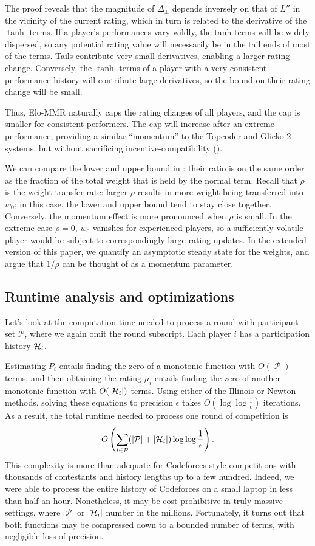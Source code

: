 The proof reveals that the magnitude of $\Delta_{\pm}$ depends inversely on that of $L''$ in the vicinity of the current rating, which in turn is related to the derivative of the $\tanh$ terms. If a player's performances vary wildly, the tanh terms will be widely dispersed, so any potential rating value will necessarily be in the tail ends of most of the terms. Tails contribute very small derivatives, enabling a larger rating change. Conversely, the $\tanh$ terms of a player with a very consistent performance history will contribute large derivatives, so the bound on their rating change will be small.

Thus, Elo-MMR naturally caps the rating changes of all players, and the cap is smaller for consistent performers. The cap will increase after an extreme performance, providing a similar ``momentum'' to the Topcoder and Glicko-2 systems, but without sacrificing incentive-compatibility ().

We can compare the lower and upper bound in : their ratio is on the same order as the fraction of the total weight that is held by the normal term. Recall that $\rho$ is the weight transfer rate: larger $\rho$ results in more weight being transferred into $w_0$; in this case, the lower and upper bound tend to stay close together. Conversely, the momentum effect is more pronounced when $\rho$ is small. In the extreme case $\rho=0$, $w_0$ vanishes for experienced players, so a sufficiently volatile player would be subject to correspondingly large rating updates. In the extended version of this paper, we quantify an asymptotic steady state for the weights, and argue that $1/\rho$ can be thought of as a momentum parameter.

\subsection{Runtime analysis and optimizations}
\label{sec:runtime}
Let's look at the computation time needed to process a round with participant set $\mathcal P$, where we again omit the round subscript. Each player $i$ has a participation history ${\mathcal{H}}_i$.

Estimating $P_i$ entails finding the zero of a monotonic function with $O(|\mathcal P|)$ terms, and then obtaining the rating $\mu_i$ entails finding the zero of another monotonic function with $O(|{\mathcal{H}}_i|)$ terms. Using either of the Illinois or Newton methods, solving these equations to precision $\epsilon$ takes $O(\log\log\frac 1\epsilon)$ iterations. As a result, the total runtime needed to process one round of competition is
\[O\left(\sum_{i\in\mathcal P}(|\mathcal P| + |{\mathcal{H}}_i|) \log\log\frac 1\epsilon\right).\]
This complexity is more than adequate for Codeforces-style competitions with thousands of contestants and history lengths up to a few hundred. Indeed, we were able to process the entire history of Codeforces on a small laptop in less than half an hour. Nonetheless, it may be cost-prohibitive in truly massive settings, where $|\mathcal P|$ or $|{\mathcal{H}}_i|$ number in the millions. Fortunately, it turns out that both functions may be compressed down to a bounded number of terms, with negligible loss of precision.

